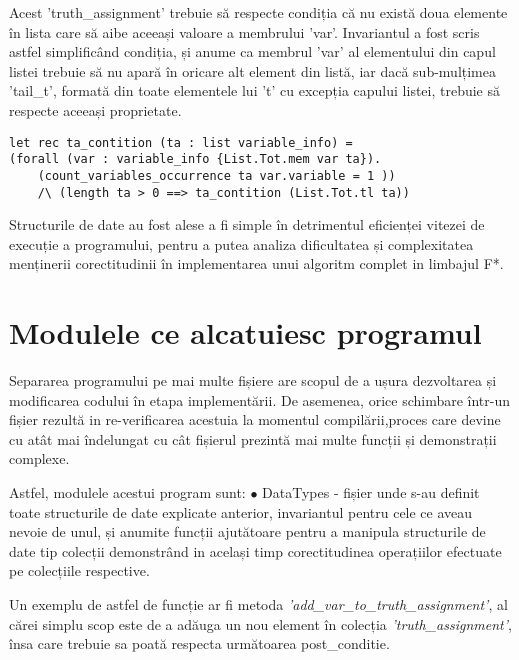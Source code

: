 Acest 'truth\_assignment' trebuie să respecte condiția că nu există doua elemente în lista care să aibe aceeași valoare a membrului 'var'. Invariantul a fost scris astfel simplificând condiția, și anume ca membrul 'var' al elementului din capul listei trebuie să nu apară în oricare alt element din listă, iar dacă sub-mulțimea 'tail\_t', formată din toate elementele lui 't' cu excepția capului listei, trebuie să respecte aceeași proprietate.

\begin{lstlisting}[]
let rec ta_contition (ta : list variable_info) = 
(forall (var : variable_info {List.Tot.mem var ta}). 
	(count_variables_occurrence ta var.variable = 1 ))
	/\ (length ta > 0 ==> ta_contition (List.Tot.tl ta))

\end{lstlisting}

Structurile de date au fost alese a fi simple în detrimentul eficienței vitezei de execuție a programului, pentru a putea analiza dificultatea și complexitatea menținerii corectitudinii în implementarea unui algoritm complet in limbajul F*. 



\section{Modulele ce alcatuiesc programul}

Separarea programului pe mai multe fișiere are scopul de a ușura \newline dezvoltarea și modificarea codului în etapa implementării. De asemenea, orice \newline schimbare într-un fișier rezultă in re-verificarea acestuia la momentul compilării,\newline proces care devine cu atât mai îndelungat cu cât fișierul prezintă mai multe funcții și demonstrații complexe.

\newpage

Astfel, modulele acestui program sunt: \newline
$\bullet$ DataTypes - fișier unde s-au definit toate structurile de date explicate anterior, \newline invariantul pentru cele ce aveau nevoie de unul, și anumite funcții ajutătoare pentru a manipula structurile de date tip colecții demonstrând in același timp corectitudinea \newline operațiilor efectuate pe colecțiile respective. 

Un exemplu de astfel de funcție ar fi metoda
\textit{'add\_var\_to\_truth\_assignment'}, al cărei simplu scop este de a adăuga un nou element în colecția \textit{'truth\_assignment'}, însa care trebuie sa poată respecta următoarea post\_conditie.

